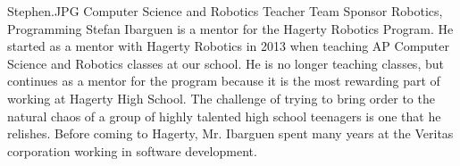 {Stephen.JPG} 
{Computer Science and \newline Robotics Teacher} 
{Team Sponsor} 
{Robotics, Programming}
{
Stefan Ibarguen is a mentor for the Hagerty Robotics Program.  He started as a mentor with Hagerty Robotics in 2013 when teaching AP Computer Science and Robotics classes at our school.  He is no longer teaching classes, but continues as a mentor for the program because it is the most rewarding part of working at Hagerty High School.  The challenge of trying to bring order to the natural chaos of a group of highly talented high school teenagers is one that he relishes.  Before coming to Hagerty, Mr. Ibarguen spent many years at the Veritas corporation working in software development.  \\
}